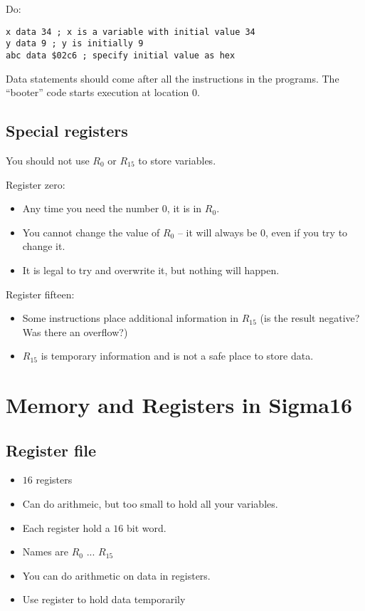 Do:
\begin{verbatim}
x data 34 ; x is a variable with initial value 34
y data 9 ; y is initially 9
abc data $02c6 ; specify initial value as hex
\end{verbatim}
Data statements should come after all the instructions in the programs.
The ``booter'' code starts execution at location \(0\).

\subsection{Special registers}\label{sub:special_registers}

You should not use \(R_0\) or \(R_{15}\) to store variables.

Register zero:
\begin{itemize}
	\item Any time you need the number \(0\), it is in \(R_0\).
	\item You cannot change the value of \(R_0\) -- it will always  be \(0\), even if you try to change it.
	\item It is legal to try and overwrite it, but nothing will happen.
\end{itemize}
%
Register fifteen:
\begin{itemize}
	\item Some instructions place additional information in \(R_{15}\) (is the result negative? Was there an overflow?)
	\item \(R_{15}\) is temporary information and is not a safe place to store data.
\end{itemize}

\section{Memory and Registers in Sigma16}\label{sec:memory_and_registers_in_sigma16}

\subsection{Register file}\label{sub:register_file_one}

\begin{itemize}
	\item \(16\) registers
	\item Can do arithmeic, but too small to hold all your variables.
	\item Each register hold a \(16\) bit word.
	\item Names are \(R_0\) ...  \(R_{15}\)
	\item You can do arithmetic on data in registers.
	\item Use register to hold data temporarily
\end{itemize}

